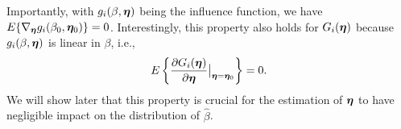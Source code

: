 \documentclass[12pt]{article}
\begin{document}
{%

Importantly, 
with $g_i(\beta, \bm \eta)$ being the  influence function, we have  $E\{\nabla_{\bm \eta} g_i(\beta_0, \bm \eta_0) \} =0$.   Interestingly, this property also holds for $ G_i(\bm \eta) $  because $ g_i(\beta, \bm \eta) $ is linear in $ \beta $, i.e., 
	\begin{align*}
		E\left\{   \frac{\partial G_i ( \bm \eta) }{\partial \bm \eta} \big|_{\bm \eta= \bm \eta_{0}} \right\}=0.
	\end{align*} 
We will show later that this property is crucial for the estimation of $ \bm \eta $ to have negligible impact on the distribution of  $ \hat\beta $. 











}
\end{document}
